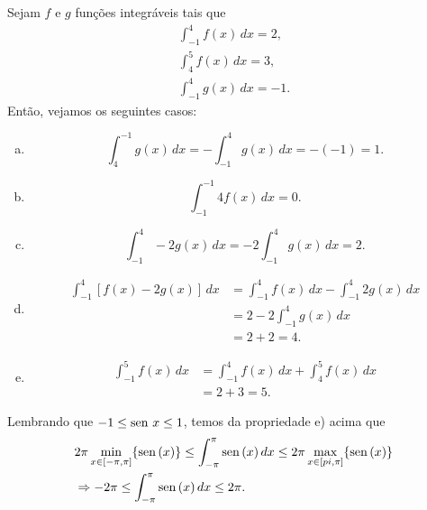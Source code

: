 \cleardoublepage\documentclass[../main.tex]{subfiles}
\begin{document}
\begin{ex}
  Sejam $f$ e $g$ funções integráveis tais que
  \begin{align*}
    \int_{-1}^4 f(x)\,dx = 2,\\
    \int_4^5 f(x)\,dx = 3,\\
    \int_{-1}^4 g(x)\,dx = -1.
  \end{align*}
  Então, vejamos os seguintes casos:
  \begin{enumerate}[a)]
  \item
    \begin{equation*}
      \int_{4}^{-1} g(x)\,dx = -\int_{-1}^4 g(x)\,dx = -(-1) = 1.
    \end{equation*}
  \item
    \begin{equation*}
      \int_{-1}^{-1} 4f(x)\,dx = 0.
    \end{equation*}
  \item
    \begin{equation*}
      \int_{-1}^{4} -2g(x)\,dx = -2\int_{-1}^4 g(x)\,dx = 2.
    \end{equation*}
  \item
    \begin{align*}
      \int_{-1}^{4} \left[f(x) - 2g(x)\right]\,dx &= \int_{-1}^{4} f(x)\,dx - \int_{-1}^4 2g(x)\,dx \\
                                                  &= 2 - 2\int_{-1}^4 g(x)\,dx \\
                                                  &= 2 + 2 = 4.
    \end{align*}
  \item
    \begin{align*}
      \int_{-1}^5 f(x)\,dx &= \int_{-1}^4 f(x)\,dx + \int_{4}^5 f(x)\,dx \\
                           &= 2 + 3 = 5.
    \end{align*}
  \end{enumerate}
\end{ex}

\begin{ex}
  Lembrando que $-1 \leq \operatorname{sen}\, x \leq 1$, temos da propriedade e) acima que
  \begin{align}
    &2\pi \min_{x\in [-\pi, \pi]} \{\operatorname{sen}\,(x)\} \leq \int_{-\pi}^\pi \operatorname{sen}\,(x)\,dx \leq 2\pi \max_{x\in [\-pi, \pi]} \{\operatorname{sen}\,(x)\} \\
    &\Rightarrow -2\pi \leq \int_{-\pi}^\pi \operatorname{sen}\,(x)\,dx \leq 2\pi.
  \end{align}
\end{ex}
\end{document}
